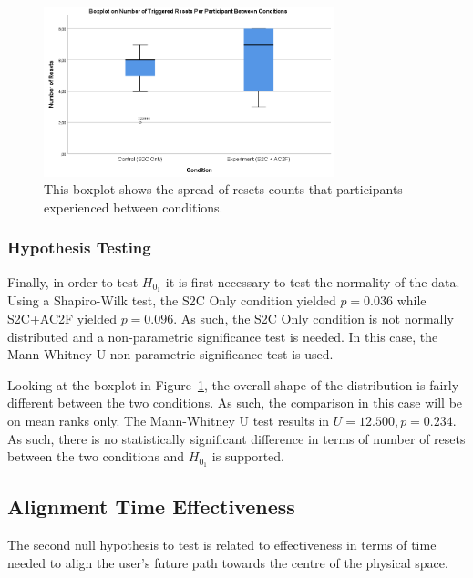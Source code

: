 \begin{figure}[tbph]
    \centering
    \includegraphics[width=0.75\textwidth]{figures/graphs/resetCountBoxPlot.png}
    \caption[Boxplot on Number of Resets Per Participant Between Conditions for Experiment 2]{This boxplot shows the spread of resets counts that participants experienced between conditions.}
    \label{fig:ex2resetboxplot}
\end{figure}

\subsubsection{Hypothesis Testing}
Finally, in order to test $H_{0_1}$ it is first necessary to test the normality of the data. Using a Shapiro-Wilk test, the S2C Only condition yielded $p = 0.036$ while S2C+AC2F yielded $p = 0.096$. As such, the S2C Only condition is not normally distributed and a non-parametric significance test is needed. In this case, the Mann-Whitney U non-parametric significance test is used. 

Looking at the boxplot in Figure~\ref{fig:ex2resetboxplot}, the overall shape of the distribution is fairly different between the two conditions. As such, the comparison in this case will be on mean ranks only. The Mann-Whitney U test results in $U = 12.500, p = 0.234$. As such, there is no statistically significant difference in terms of number of resets between the two conditions and $H_{0_1}$ is supported.

\subsection{Alignment Time Effectiveness}
The second null hypothesis to test is related to effectiveness in terms of time needed to align the user's future path towards the centre of the physical space. 

